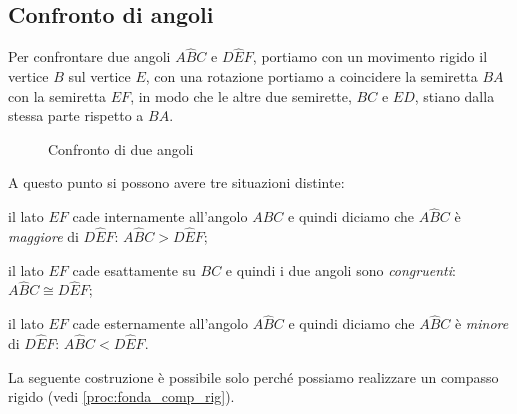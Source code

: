 \subsection{Confronto di angoli}

Per confrontare due angoli $A\widehat{B}C$ e $D\widehat{E}F$, 
portiamo con un movimento rigido il vertice $B$ sul vertice $E$, con 
una rotazione portiamo a coincidere la semiretta $BA$ con la 
semiretta $EF$, in modo che le altre due semirette, $BC$ e $ED$, 
stiano dalla stessa parte rispetto a $BA$.


\begin{inaccessibleblock}
 \begin{figure}[htb]
\centering
\caption{Confronto di due angoli}
\end{figure}
\end{inaccessibleblock}

A questo punto si possono avere tre situazioni distinte:
\begin{itemize*}
\item il lato $EF$ cade internamente all'angolo $A\widehat{B}C$ e 
quindi diciamo che $A\widehat{B}C$ è \emph{maggiore} di 
$D\widehat{E}F$: $A\widehat{B}C>D\widehat{E}F$;
\item il lato $EF$ cade esattamente su $BC$ e quindi i due angoli 
sono \emph{congruenti}: $A\widehat{B}C\cong D\widehat{E}F$;
\item il lato $EF$ cade esternamente all'angolo $A\widehat{B}C$ e 
quindi diciamo che $A\widehat{B}C$ è \emph{minore} di 
$D\widehat{E}F$: $A\widehat{B}C<D\widehat{E}F$.
\end{itemize*}

\begin{comment}
Puoi usare le seguenti righe per come schema da riempire ogni volta che vuoi 
descrivere una procedura
Le copi dove vuoi realizzare una procedura, aggiungi gli \item necessari, e ci 
copi dentro i pezzi di testo che hai già scritto.

Con riga e compasso.

\begin{procedura}[<nome della costruzione>]
 :
\begin{enumerate} [nosep]
\item 

\item 

\item 

\end{enumerate}
\end{procedura}

Con la geometria interattiva.



\end{comment}
\begin{osservazione}
 La seguente costruzione è possibile solo perché possiamo realizzare un 
compasso rigido (vedi \ref{proc:fonda_comp_rig}).
\end{osservazione}

